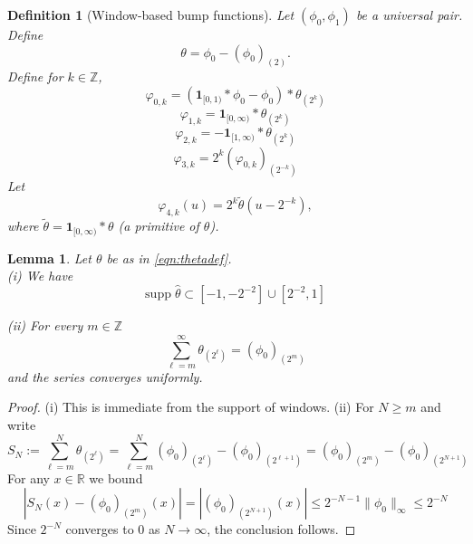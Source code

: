 \documentclass[12pt,reqno]{amsart}
\theoremstyle{plain}
\newtheorem{lemma}[theorem]{Lemma}
\newtheorem{definition}[theorem]{Definition}
\numberwithin{equation}{section}
\theoremstyle{remark}
\newcommand{\uses}[1]{}
\newcommand{\usesdefs}[1]{}
\newcommand{\R}{{\mathbb R}}
\begin{document}
\begin{definition}[Window-based bump functions]\label{defn:window based bump functions}\uses{lem:cpair}\usesdefs{def:unipair}
Let $(\phi_0,\phi_1)$ be a universal pair.
Define
\begin{equation}\label{eqn:thetadef}
{\theta}={\phi_0}-{(\phi_0)}_{(2)}.
\end{equation}
Define for $k\in\mathbb{Z}$,
\begin{equation}\label{eqn:varphi0kdef}
\varphi_{0,k} = (\mathbf{1}_{[0,1)}\ast\phi_0 - \phi_0)\ast \theta_{(2^{k})}
\end{equation}
\begin{equation}\label{eqn:varphi1kdef}\varphi_{1,k} = \mathbf{1}_{[0,\infty)}\ast\theta_{(2^k)}
\end{equation}
\begin{equation}\label{eqn:varphi2kdef}\varphi_{2,k} = -\mathbf{1}_{[1,\infty)}\ast\theta_{(2^k)}
\end{equation}
\begin{equation}\label{eqn:varphi3def}
\varphi_{3,k} = 2^{k}(\varphi_{0,k})_{(2^{-k})}
\end{equation}
Let
\begin{equation}\label{eqn:varphi4kdef}
\varphi_{4,k}(u)=2^k\widetilde{\theta}(u-2^{-k}),
\end{equation}
where $\widetilde{\theta}=\mathbf{1}_{[0,\infty)}*\theta$ (a primitive of $\theta$).
\end{definition}

\begin{lemma}\label{lem:bumpbasic}\uses{}\usesdefs{def:cn-window,def:unipair,defn:window based bump functions}
Let $\theta$ be as in \eqref{eqn:thetadef}.\\

(i) We have
\begin{equation}\label{auto:theta-Fourier-support} \mathrm{supp}\;\widehat{\theta} \subset [-1,-2^{-2}]\cup [2^{-2},1] \end{equation}

(ii) For every $m\in\mathbb{Z}$
\begin{equation}\label{auto:theta-telescoping-sum} \sum_{\ell=m}^\infty \theta_{(2^\ell)} = (\phi_0)_{(2^m)} \end{equation}
and the series converges uniformly.
\end{lemma}

\begin{proof}
(i) This is immediate from the support of windows.
(ii) For  $N\ge m$ and write
\[ S_N := \sum_{\ell=m}^N \theta_{(2^\ell)} =  \sum_{\ell=m}^N (\phi_0)_{(2^\ell)} - (\phi_0)_{(2^{\ell+1})} = (\phi_0)_{(2^m)} - (\phi_0)_{(2^{N+1})} \]
For any $x\in \R$ we  bound
\[|S_N(x)-(\phi_0)_{(2^m)}(x)| = |(\phi_0)_{(2^{N+1})}(x)|  \le 2^{-N-1}\|\phi_0\|_\infty \le 2^{-N} \]
Since $2^{-N}$ converges   to $0$ as $N\to \infty$, the conclusion follows.
\end{proof}
\end{document}
